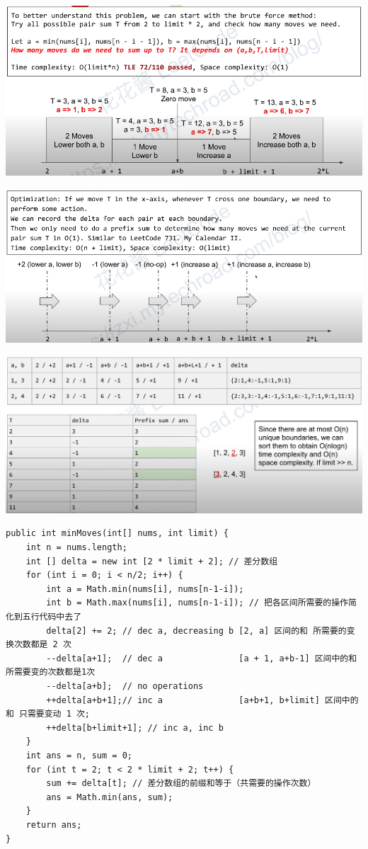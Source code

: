 \documentclass[9pt, b5paaper]{book}
\begin{document}
\includegraphics[width=.9\linewidth]{./pic/diffArray.png}

\includegraphics[width=.9\linewidth]{./pic/diffArray2.png}

\includegraphics[width=.9\linewidth]{./pic/diffArray3.png}

\begin{verbatim}
public int minMoves(int[] nums, int limit) {
    int n = nums.length;
    int [] delta = new int [2 * limit + 2]; // 差分数组
    for (int i = 0; i < n/2; i++) {
        int a = Math.min(nums[i], nums[n-1-i]);
        int b = Math.max(nums[i], nums[n-1-i]); // 把各区间所需要的操作简化到五行代码中去了
        delta[2] += 2; // dec a, decreasing b [2, a] 区间的和 所需要的变换次数都是 2 次
        --delta[a+1];  // dec a               [a + 1, a+b-1] 区间中的和 所需要变的次数都是1次
        --delta[a+b];  // no operations
        ++delta[a+b+1];// inc a               [a+b+1, b+limit] 区间中的和 只需要变动 1 次;
        ++delta[b+limit+1]; // inc a, inc b
    }
    int ans = n, sum = 0;
    for (int t = 2; t < 2 * limit + 2; t++) {
        sum += delta[t]; // 差分数组的前缀和等于（共需要的操作次数）
        ans = Math.min(ans, sum);
    }
    return ans;
}
\end{verbatim}
\end{document}
